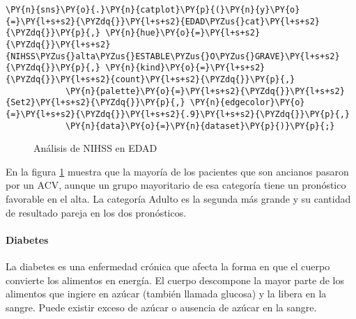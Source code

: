     \begin{tcolorbox}[breakable, size=fbox, boxrule=1pt, pad at break*=1mm,colback=cellbackground, colframe=cellborder]
\begin{Verbatim}[commandchars=\\\{\}]
\PY{n}{sns}\PY{o}{.}\PY{n}{catplot}\PY{p}{(}\PY{n}{y}\PY{o}{=}\PY{l+s+s2}{\PYZdq{}}\PY{l+s+s2}{EDAD\PYZus{}cat}\PY{l+s+s2}{\PYZdq{}}\PY{p}{,} \PY{n}{hue}\PY{o}{=}\PY{l+s+s2}{\PYZdq{}}\PY{l+s+s2}{NIHSS\PYZus{}alta\PYZus{}ESTABLE\PYZus{}O\PYZus{}GRAVE}\PY{l+s+s2}{\PYZdq{}}\PY{p}{,} \PY{n}{kind}\PY{o}{=}\PY{l+s+s2}{\PYZdq{}}\PY{l+s+s2}{count}\PY{l+s+s2}{\PYZdq{}}\PY{p}{,}
            \PY{n}{palette}\PY{o}{=}\PY{l+s+s2}{\PYZdq{}}\PY{l+s+s2}{Set2}\PY{l+s+s2}{\PYZdq{}}\PY{p}{,} \PY{n}{edgecolor}\PY{o}{=}\PY{l+s+s2}{\PYZdq{}}\PY{l+s+s2}{.9}\PY{l+s+s2}{\PYZdq{}}\PY{p}{,}
            \PY{n}{data}\PY{o}{=}\PY{n}{dataset}\PY{p}{)}\PY{p}{;}
\end{Verbatim}
\end{tcolorbox}

\begin{center}
    	\begin{figure}[H]
	\centering
	\caption{Análisis de NIHSS en EDAD}
	\label{fig:aNISSEdad}
	\end{figure}
\end{center}
    
    En la figura \ref{fig:aNISSEdad} muestra que la mayoría de los pacientes que son ancianos pasaron por un ACV, aunque un grupo mayoritario de esa categoría tiene un pronóstico favorable en el alta. La categoría Adulto es la segunda más grande y su cantidad de resultado pareja en los dos pronósticos.

    \hypertarget{diabetes}{%
\paragraph{Diabetes}\label{diabetes}}

La diabetes es una enfermedad crónica que afecta la forma en que el cuerpo convierte los alimentos en energía. El cuerpo descompone la mayor parte de los alimentos que ingiere en azúcar (también llamada glucosa) y la libera en la sangre. Puede existir exceso de azúcar o ausencia de azúcar en la sangre.

